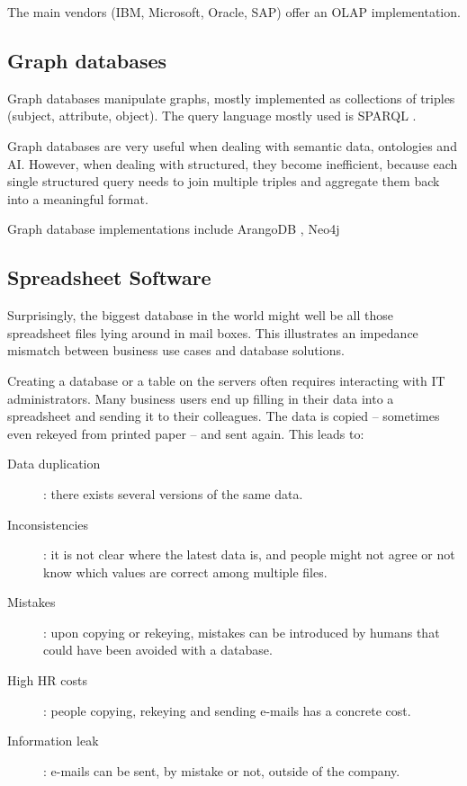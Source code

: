 \documentclass{acm_proc_article-sp}
\begin{document}
The main vendors (IBM, Microsoft, Oracle, SAP) offer an OLAP implementation.

\subsection{Graph databases}

Graph databases manipulate graphs, mostly implemented as collections of triples (subject, attribute, object). The query language mostly used is SPARQL \cite{SPARQL}.

Graph databases are very useful when dealing with semantic data, ontologies and AI. However, when dealing with structured, they become inefficient, because each single structured query needs to join multiple triples and aggregate them back into a meaningful format.

Graph database implementations include ArangoDB \cite{ArangoDB}, Neo4j \cite{Neo4j}

\subsection{Spreadsheet Software}

Surprisingly, the biggest database in the world might well be all those spreadsheet files lying around in mail boxes. This illustrates an impedance mismatch between business use cases and database solutions.

Creating a database or a table on the servers often requires interacting with IT administrators. Many business users end up filling in their data into a spreadsheet and sending it to their colleagues. The data is copied -- sometimes even rekeyed from printed paper -- and sent again. This leads to:

\begin{description}
\item[Data duplication]: there exists several versions of the same data.
\item [Inconsistencies]: it is not clear where the latest data is, and people might not agree or not know which values are correct among multiple files.
\item[Mistakes]: upon copying or rekeying, mistakes can be introduced by humans that could have been avoided with a database.
\item[High HR costs]: people copying, rekeying and sending e-mails has a concrete cost.
\item[Information leak]: e-mails can be sent, by mistake or not, outside of the company.
\end{description}
\end{document}
